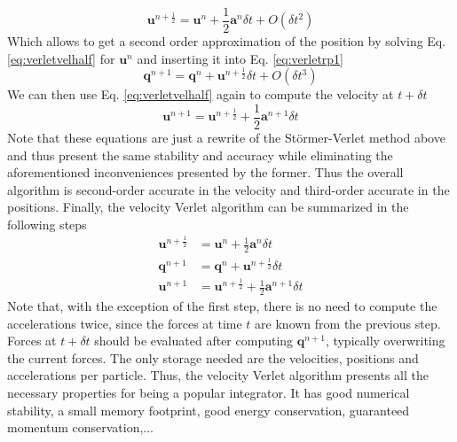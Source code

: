 \documentclass[ twoside,openright,titlepage,numbers=noenddot,%
headinclude,footinclude,cleardoublepage=empty,abstract=on,
BCOR=5mm,paper=b5,fontsize=11pt, dvipsnames
]{scrreprt}
\renewcommand{\vec}[1]{\bm{#1}}
\newcommand{\dt}{\delta t}
\newcommand{\half}{\frac{1}{2}}
\newcommand{\ppos}{q}
\newcommand{\pvel}{u}
\begin{document}
\begin{equation}
  \label{eq:verletvelhalf}
  \vec{\pvel}^{n+\half} = \vec{\pvel}^n + \half\vec{a}^n\dt + O(\dt^2)
\end{equation}
Which allows to get a second order approximation of the position by  solving Eq. \eqref{eq:verletvelhalf} for $\vec{\pvel}^n$ and inserting it into Eq. \eqref{eq:verletrp1}
\begin{equation}
  \vec{\ppos}^{n+1} = \vec{\ppos}^n +  \vec{\pvel}^{n+\half}\dt + O(\dt^3)
\end{equation}
We can then use Eq. \eqref{eq:verletvelhalf} again to compute the velocity at $t+\dt$
\begin{equation}
  \vec{\pvel}^{n+1} = \vec{\pvel}^{n+\half} + \half\vec{a}^{n+1}\dt
\end{equation}
Note that these equations are just a rewrite of the Störmer-Verlet method above and thus present the same stability and accuracy while eliminating the aforementioned inconveniences presented by the former.
Thus the overall algorithm is second-order accurate in the velocity and third-order accurate in the positions.
Finally, the velocity Verlet algorithm can be summarized in the following steps
\begin{equation}
  \label{eq:verletnve}
  \begin{aligned}
    \vec{\pvel}^{n+\half}&= \vec{\pvel}^n + \half \vec{a}^n\dt\\
  \vec{\ppos}^{n+1}      &= \vec{\ppos}^n +  \vec{\pvel}^{n+\half}\dt\\
  \vec{\pvel}^{n+1}      &= \vec{\pvel}^{n+\half} + \half\vec{a}^{n+1}\dt
\end{aligned}
\end{equation}
Note that, with the exception of the first step, there is no need to compute the accelerations twice, since the forces at time $t$ are known from the previous step. Forces at $t+\dt$ should be evaluated after computing $\vec{\ppos}^{n+1}$, typically overwriting the current forces. The only storage needed are the velocities, positions and accelerations per particle.
Thus, the velocity Verlet algorithm presents all the necessary properties for being a popular integrator. It has good numerical stability, a small memory footprint, good energy conservation, guaranteed momentum conservation,...

%
\end{document}
